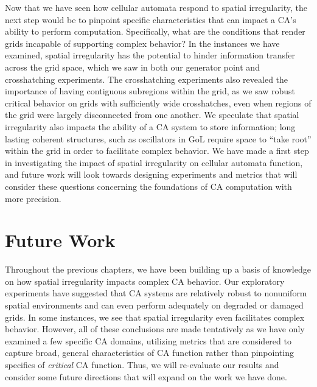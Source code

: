\documentclass[a4paper,11pt,twoside]{report}
\begin{document}
Now that we have seen how cellular automata respond to spatial irregularity, the next step would be to pinpoint specific characteristics that can impact a CA's ability to perform computation. Specifically, what are the conditions that render grids incapable of supporting complex behavior? In the instances we have examined, spatial irregularity has the potential to hinder information transfer across the grid space, which we saw in both our generator point and crosshatching experiments. The crosshatching experiments also revealed the importance of having contiguous subregions within the grid, as we saw robust critical behavior on grids with sufficiently wide crosshatches, even when regions of the grid were largely disconnected from one another. We speculate that spatial irregularity also impacts the ability of a CA system to store information; long lasting coherent structures, such as oscillators in GoL require space to ``take root'' within the grid in order to facilitate complex behavior. We have made a first step in investigating the impact of spatial irregularity on cellular automata function, and future work will look towards designing experiments and metrics that will consider these questions concerning the foundations of CA computation with more precision. 


\processdelayedfloats

\chapter{Future Work}
\label{ch:future_work}

Throughout the previous chapters, we have been building up a basis of knowledge on how spatial irregularity impacts complex CA behavior. Our exploratory experiments have suggested that CA systems are relatively robust to nonuniform spatial environments and can even perform adequately on degraded or damaged grids. In some instances, we see that spatial irregularity even facilitates complex behavior. However, all of these conclusions are made tentatively as we have only examined a few specific CA domains, utilizing metrics that are considered to capture broad, general characteristics of CA function rather than pinpointing specifics of \textit{critical} CA function. Thus, we will re-evaluate our results and consider some future directions that will expand on the work we have done.
\end{document}
